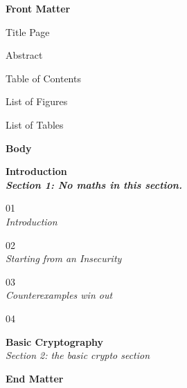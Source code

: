 \documentclass{report}
\begin{document}
\begin{outline} %

    \item \bf{Front Matter}
    \begin{outline} %
        \item Title Page
        \item Abstract
        \item Table of Contents
        \item List of Figures
        \item List of Tables
    \end{outline} 
    \item \bf{Body}
    \begin{outline} 


        \item \bf{Introduction} \\
        \textit{Section 1: No maths in this section.}
        \begin{outline} %
            \item \rm{01} \\
            \textit{Introduction}
            \item \rm{02} \\
            \textit{Starting from an Insecurity}
            \item \rm{03} \\
            \textit{Counterexamples win out}
            \item \rm{04}
        \end{outline} 
        \item \rm{\bf{Basic Cryptography}} \\
        \textit{Section 2: the basic crypto section}
        \begin{outline} %
            \item
        \end{outline} 
         \item \bf{}
    \end{outline} 

    \item \bf{End Matter} 
    \begin{outline} %
    \end{outline} %
\end{outline} %
	
	
\end{document}
